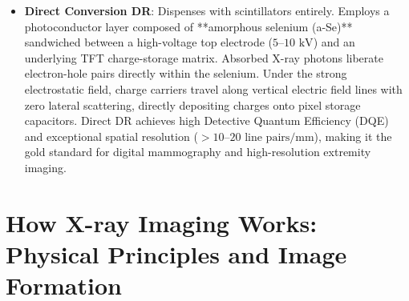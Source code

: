 \documentclass[11pt,a4paper]{article}
\begin{document}
\begin{enumerate}[leftmargin=*]
\begin{itemize}
        \item \textbf{Direct Conversion DR}: Dispenses with scintillators entirely. Employs a photoconductor layer composed of **amorphous selenium (a-Se)** sandwiched between a high-voltage top electrode ($5\text{--}10\text{ kV}$) and an underlying TFT charge-storage matrix. Absorbed X-ray photons liberate electron-hole pairs directly within the selenium. Under the strong electrostatic field, charge carriers travel along vertical electric field lines with zero lateral scattering, directly depositing charges onto pixel storage capacitors. Direct DR achieves high Detective Quantum Efficiency (DQE) and exceptional spatial resolution ($>10\text{--}20\text{ line pairs/mm}$), making it the gold standard for digital mammography and high-resolution extremity imaging.
    \end{itemize}
\end{enumerate}

\section{How X-ray Imaging Works: Physical Principles and Image Formation}
\end{document}
